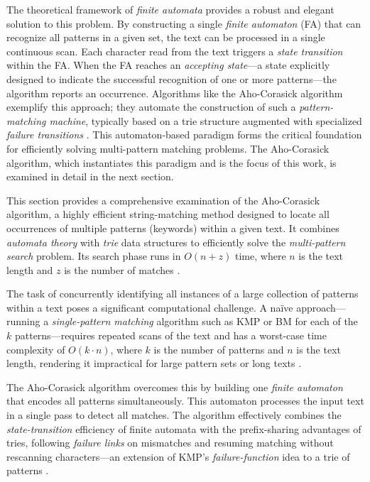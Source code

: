 The theoretical framework of \textit{finite automata} provides a robust and elegant solution to this problem. By constructing a single \textit{finite automaton} (FA) that can recognize all patterns in a given set, the text can be processed in a single continuous scan. Each character read from the text triggers a \textit{state transition} within the FA. When the FA reaches an \textit{accepting state}---a state explicitly designed to indicate the successful recognition of one or more patterns---the algorithm reports an occurrence. Algorithms like the Aho-Corasick algorithm exemplify this approach; they automate the construction of such a \textit{pattern-matching machine}, typically based on a trie structure augmented with specialized \textit{failure transitions} \cite{AhoCorasick1975}. This automaton-based paradigm forms the critical foundation for efficiently solving multi-pattern matching problems. The Aho-Corasick algorithm, which instantiates this paradigm and is the focus of this work, is examined in detail in the next section.



\providecommand{\acfunc}[1]{\ensuremath{\mathtt{#1}}}


This section provides a comprehensive examination of the Aho-Corasick algorithm, a highly efficient string-matching method designed to locate all occurrences of multiple patterns (keywords) within a given text. It combines \textit{automata theory} with \textit{trie} data structures to efficiently solve the \textit{multi-pattern search} problem. Its search phase runs in $O(n + z)$ time, where $n$ is the text length and $z$ is the number of matches \cite{AhoCorasick1975}.


The task of concurrently identifying all instances of a large collection of patterns within a text poses a significant computational challenge. A na\"ive approach---running a \textit{single-pattern matching} algorithm such as KMP or BM for each of the $k$ patterns---requires repeated scans of the text and has a worst-case time complexity of $O(k \cdot n)$, where $k$ is the number of patterns and $n$ is the text length, rendering it impractical for large pattern sets or long texts \cite{Gusfield1997}.

The Aho-Corasick algorithm overcomes this by building one \textit{finite automaton} that encodes all patterns simultaneously. This automaton processes the input text in a single pass to detect all matches. The algorithm effectively combines the \textit{state-transition} efficiency of finite automata with the prefix-sharing advantages of tries, following \textit{failure links} on mismatches and resuming matching without rescanning characters---an extension of KMP’s \textit{failure-function} idea to a trie of patterns \cite{Gusfield1997}.

